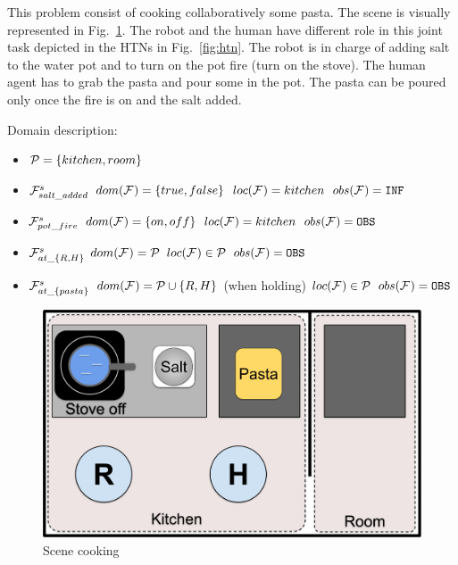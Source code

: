 \documentclass[letterpaper]{article} %
\begin{document}
This problem consist of cooking collaboratively some pasta. The scene is visually represented in Fig.~\ref{fig:scene}.
The robot and the human have different role in this joint task depicted in the HTNs in Fig.~\ref{fig:htn}. The robot is in charge of adding salt to the water pot and to turn on the pot fire (turn on the stove). The human agent has to grab the pasta and pour some in the pot. The pasta can be poured only once the fire is on and the salt added. 

Domain description:

\begin{itemize}
    \item $\mathcal{P} = \{ kitchen, room \}$
    
    \item $\mathcal{F}^{s}_{salt\_added}$
        \subitem $dom(\mathcal{F}^{}_{}) = \{ true, false \}$
        \subitem $loc(\mathcal{F}^{}_{}) = kitchen$
        \subitem $obs(\mathcal{F}^{}_{}) = \texttt{INF}$

    \item $\mathcal{F}^{s}_{pot\_fire}$
        \subitem $dom(\mathcal{F}^{}_{}) = \{ on, off \}$ 
        \subitem $loc(\mathcal{F}^{}_{}) = kitchen$ 
        \subitem $obs(\mathcal{F}^{}_{}) = \texttt{OBS}$ 
    
    \item $\mathcal{F}^{s}_{at\_\{R,H\}}$
        \subitem $dom(\mathcal{F}^{}_{}) = \mathcal{P}$ 
        \subitem $loc(\mathcal{F}^{}_{}) \in  \mathcal{P}$ 
        \subitem $obs(\mathcal{F}^{}_{}) = \texttt{OBS}$ 

    \item $\mathcal{F}^{s}_{at\_\{pasta\}}$
        \subitem $dom(\mathcal{F}^{}_{}) = \mathcal{P} \cup \{ R, H \}$ (when holding)
        \subitem $loc(\mathcal{F}^{}_{}) \in  \mathcal{P}$ 
        \subitem $obs(\mathcal{F}^{}_{}) = \texttt{OBS}$ 
    
\end{itemize}

\begin{figure}
    \centering
    \includegraphics[width=0.8\linewidth]{figures/scene.png}
    \caption{Scene cooking}
    \label{fig:scene}
\end{figure}
\end{document}
